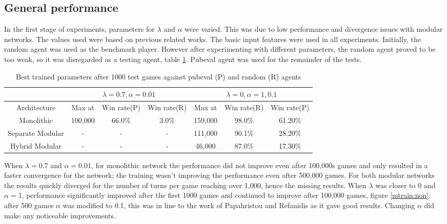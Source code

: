 \documentclass[12pt,a4paper]{article}
\begin{document}
\subsection{General performance}
In the first stage of experiments, parameters for $\lambda$ and $\alpha$ were varied. This was due to low performance and divergence issues with modular networks. The values used were based on previous related works. The basic input features were used in all experiments. Initially, the random agent was used as the benchmark player. However after experimenting with different parameters, the random agent proved to be too weak, so it was disregarded as a testing agent, table \ref{rp}. Pubeval agent was used for the remainder of the tests.
\begin{table}[htb]
    \centering
    \caption{Best trained parameters after 1000 test games against pubeval (P) and random (R) agents}
    \label{rp}
    \begin{tabular}{c|ccc|ccc}
        & \multicolumn{3}{c}{$\lambda=0.7, \alpha=0.01$} & \multicolumn{3}{|c}{$\lambda=0, \alpha=1, 0.1$} \\
        \hline
        \hline
        Architecture & Max at & Win rate(P) & Win rate(R) & Max at & Win rate(R) & Win rate(P)  \\ 
        \hline
        Monolithic & 100,000 & 66.0\% & 3.0\% & 159,000 & 98.0\% & 61.20\% \\ 
        \hline
        Separate Modular & - & - & - & 111,000 & 90.1\% & 28.20\% \\ 
        \hline
        Hybrid Modular & - & - & - & 46,000 & 87.0\% & 17.30\% \\ 
        \hline
    \end{tabular}
\end{table}
When $\lambda=0.7$ and $\alpha=0.01$, for monolithic network the performance did not improve even after 100,000s games and only resulted in a faster convergence for the network; the training wasn't improving the performance even after 500,000 games. For both modular networks the results quickly diverged for the number of turns per game reaching over 1,000, hence the missing results. When $\lambda$ was closer to 0 and $\alpha=1$, performance significantly improved after the first 1000 games and continued to improve after 100,000 games, figure \ref{mtrain:non}; after 500 games $\alpha$ was modified to 0.1, this was in line to the work of Papahristou and Refanidis \citeyear{DBLP:conf/ifip12/PapahristouR12} as it gave good results. Changing $\alpha$ did make any noticeable improvements.
\end{document}
